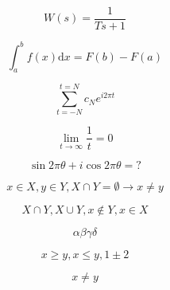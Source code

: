 \documentclass[a4paper,12pt]{article}
\begin{document}
\begin{equation}
    W(s) = \frac{1}{Ts+1}
\end{equation}

\begin{equation}
    \int_a^b{f(x)\mathrm{d}x} = F(b)-F(a)
\end{equation}

\begin{equation}
    \sum_{t=-N}^{t=N}{c_N e^{i 2 \pi t}}
\end{equation}

\begin{equation}
    \lim_{t \to \infty}{\frac{1}{t}} = 0
\end{equation}

\begin{equation}
    \sin{2 \pi \theta} + i \cos{2 \pi \theta} = ?
\end{equation}

\begin{equation}
    x \in X, y \in Y, X \cap Y = \emptyset \rightarrow x \neq y
\end{equation}

\begin{equation}
    X \cap Y, X \cup Y, x \notin Y, x \in X
\end{equation}

\begin{equation}
    \alpha \beta \gamma \delta
\end{equation}

\begin{equation}
    x \geq y, x \leq y, 1 \pm 2
\end{equation}

\begin{equation}
    x \neq y
\end{equation}
\end{document}
